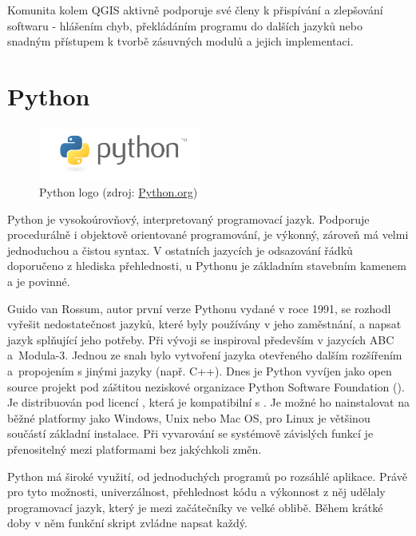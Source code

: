 Komunita kolem QGIS aktivně podporuje své členy k přispívání a
zlepšování softwaru - hlášením chyb, překládáním programu do dalších
jazyků nebo snadným přístupem k tvorbě zásuvných modulů a jejich
implementaci.


\section{Python}

\begin{figure}[H] \centering
      \includegraphics[width=150pt]{./pictures/python-logo-master-v3-TM.png}
      \caption[Python logo]{Python logo (zdroj:
\href{https://www.python.org/static/community_logos/python-logo-master-v3-TM.png}{Python.org})}
      \label{fig:python}
  \end{figure}
  
Python je vysokoúrovňový, interpretovaný programovací jazyk. Podporuje
procedurálně i objektově orientované programování, je výkonný, zároveň
má velmi jednoduchou a čistou syntax. V ostatních jazycích je
odsazování řádků doporučeno z hlediska přehlednosti, u Pythonu je
základním stavebním kamenem a je povinné.

Guido van Rossum, autor první verze Pythonu vydané v roce 1991, se
rozhodl vyřešit nedostatečnost jazyků, které byly používány v jeho
zaměstnání, a napsat jazyk splňující jeho potřeby. Při vývoji se
inspiroval především v jazycích ABC a~Modula-3. Jednou ze snah bylo
vytvoření jazyka otevřeného dalším rozšířením a~propojením s jinými
jazyky (např. C++). Dnes je Python vyvíjen jako open source projekt
pod záštitou neziskové organizace Python Software Foundation
(). Je distribuován pod licencí , která je
kompatibilní s . Je možné ho nainstalovat na běžné platformy
jako Windows, Unix nebo Mac OS, pro Linux je většinou součástí
základní instalace. Při vyvarování se systémově závislých funkcí je
přenositelný mezi platformami bez jakýchkoli změn.

Python má široké využití, od jednoduchých programů po rozsáhlé
aplikace. Právě pro tyto možnosti, univerzálnost, přehlednost kódu a
výkonnost z něj udělaly programovací jazyk, který je mezi začátečníky ve
velké oblibě. Během krátké doby v něm funkční skript zvládne napsat
každý.
  
